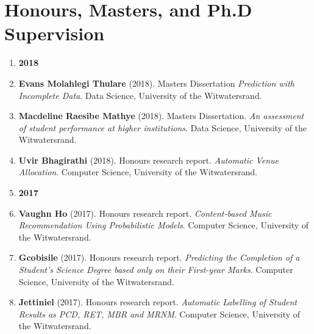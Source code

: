 \documentclass[]{friggeri-cv} %
\begin{document}
\section{Honours, Masters, and Ph.D Supervision}
\begin{enumerate}
	
	\item[] {\large \bf 2018}
	
	\item	\textbf{Evans Molahlegi Thulare} (2018). Masters Dissertation {\it Prediction with Incomplete Data}. Data Science, University of the Witwatersrand.
	\item	\textbf{Macdeline Raesibe Mathye } (2018). Masters Dissertation. {\it An assessment of student performance at higher institutions}. Data Science, University of the Witwatersrand.
	\item	\textbf{Uvir Bhagirathi} (2018). Honours research report. {\it Automatic Venue Allocation}. Computer Science, University of the Witwatersrand.
	
	\item[] {\large \bf 2017}
	
	\item	\textbf{Vaughn Ho} (2017). Honours research report. {\it Content-based Music Recommendation Using Probabilistic Models}. Computer Science,  University of the Witwatersrand.
	\item	\textbf{Gcobisile } (2017). Honours research report. {\it Predicting the Completion of a Student's Science
		Degree based only on their First-year Marks}. Computer Science, University of the Witwatersrand.
	\item	\textbf{Jettiniel} (2017). Honours research report. {\it Automatic Labelling of Student Results as PCD, RET, MBR and MRNM}. Computer Science, University of the Witwatersrand.
\end{enumerate}

%	
\end{document}
